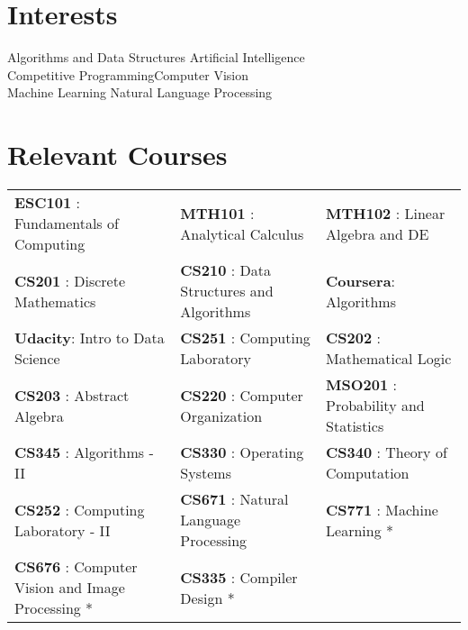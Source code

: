 \documentclass[a4paper]{norm-resume} %
\begin{document}

\section{Interests}

\vspace{2mm} %

	{\large{
	{Algorithms and Data Structures \hfill Artificial Intelligence \\
	Competitive Programming\hfill Computer Vision\\
	Machine Learning \hfill Natural Language Processing\\}		
	}}

\vspace{2mm}	%


\section{Relevant Courses}

\vspace{2mm} %
		
\begin{small}
	\begin{tabularx}{\textwidth}{X X l}
	{\textbf{ESC101} : Fundamentals of Computing} & {\textbf{MTH101} : Analytical Calculus} &{\textbf{MTH102} : Linear Algebra and DE}\\
	{\textbf{CS201} : Discrete Mathematics}&{\textbf{CS210 }: Data Structures and Algorithms} & {\textbf{Coursera}: Algorithms }\\
	{\textbf{Udacity}: Intro to Data Science } & {\textbf{CS251} : Computing Laboratory} &{\textbf{CS202} : Mathematical Logic} \\ 
	{\textbf{CS203} : Abstract Algebra} & {\textbf{CS220} : Computer Organization} & {\textbf{MSO201} : Probability and Statistics}\\
	{\textbf{CS345} : Algorithms - II}&{\textbf{CS330} : Operating Systems}&{\textbf{CS340} : Theory of Computation}\\
	{\textbf{CS252} : Computing Laboratory - II}&{\textbf{CS671} : Natural Language Processing} &{\textbf{CS771} : Machine Learning *}\\
	{\textbf{CS676} : \footnotesize{Computer Vision and Image Processing *}}&{\textbf{CS335} : Compiler Design *}
	& {\hfill \footnotesize\emphasize{* - Next Semester}}\\
	\end{tabularx}
\end{small}	
\end{document}
